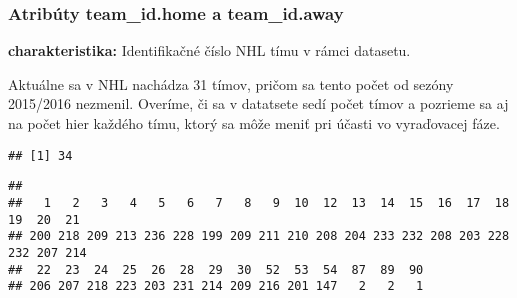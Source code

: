 \documentclass[
]{article}
\newenvironment{Shaded}{\begin{snugshade}}{\end{snugshade}}
\newcommand{\AttributeTok}[1]{\textcolor[rgb]{0.77,0.63,0.00}{#1}}
\newcommand{\ConstantTok}[1]{\textcolor[rgb]{0.00,0.00,0.00}{#1}}
\newcommand{\DecValTok}[1]{\textcolor[rgb]{0.00,0.00,0.81}{#1}}
\newcommand{\FunctionTok}[1]{\textcolor[rgb]{0.00,0.00,0.00}{#1}}
\newcommand{\NormalTok}[1]{#1}
\newcommand{\SpecialCharTok}[1]{\textcolor[rgb]{0.00,0.00,0.00}{#1}}
\newcommand{\StringTok}[1]{\textcolor[rgb]{0.31,0.60,0.02}{#1}}
\begin{document}
\hypertarget{atribuxfaty-team_id.home-a-team_id.away}{%
\subsubsection{Atribúty team\_id.home a
team\_id.away}\label{atribuxfaty-team_id.home-a-team_id.away}}

\textbf{charakteristika:} Identifikačné číslo NHL tímu v rámci datasetu.

Aktuálne sa v NHL nachádza 31 tímov, pričom sa tento počet od sezóny
2015/2016 nezmenil. Overíme, či sa v datatsete sedí počet tímov a
pozrieme sa aj na počet hier každého tímu, ktorý sa môže meniť pri
účasti vo vyraďovacej fáze.

\begin{Shaded}
\end{Shaded}

\begin{verbatim}
## [1] 34
\end{verbatim}

\begin{Shaded}
\end{Shaded}

\begin{verbatim}
## 
##   1   2   3   4   5   6   7   8   9  10  12  13  14  15  16  17  18  19  20  21 
## 200 218 209 213 236 228 199 209 211 210 208 204 233 232 208 203 228 232 207 214 
##  22  23  24  25  26  28  29  30  52  53  54  87  89  90 
## 206 207 218 223 203 231 214 209 216 201 147   2   2   1
\end{verbatim}

\begin{Shaded}
\end{Shaded}
\end{document}
